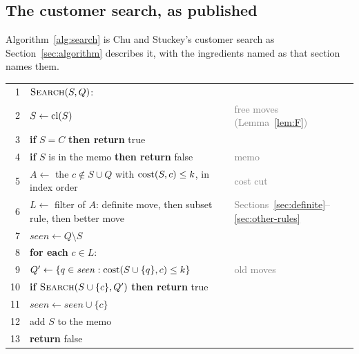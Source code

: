 \subsection{The customer search, as published}
\label{app:algorithm}

Algorithm~\ref{alg:search} is Chu and Stuckey's customer search as Section~\ref{sec:algorithm}
describes it, with the ingredients named as that section names them.

\begin{algorithm}[t]
\caption{The customer search \citep{ChuStuckey2009} is a plain depth-first
search; all its pruning sits in the memo (lines~4 and~12), the filter
(line~6) and the old moves (line~9). It decides $\Sol_k(S)$ for a graph
$G=(C,E)$ and a stack bound $k$, and is called as
$\textsc{Search}(\emptyset,\emptyset)$. $Q$ is the set of old moves the node
inherits.}
\label{alg:search}
\small
\begin{tabular}{@{}r@{\quad}l@{\qquad}l@{}}
1 & $\textsc{Search}(S,Q)$: & \\
2 & \quad $S\gets\mathrm{cl}(S)$ & \textcolor{gray}{free moves (Lemma~\ref{lem:F})} \\
3 & \quad \textbf{if} $S=C$ \textbf{then return} true & \\
4 & \quad \textbf{if} $S$ is in the memo \textbf{then return} false & \textcolor{gray}{memo} \\
5 & \quad $A\gets$ the $c\notin S\cup Q$ with $\mathrm{cost}(S,c)\le k$, in index order & \textcolor{gray}{cost cut} \\
6 & \quad $L\gets$ filter of $A$: definite move, then subset rule, then better move & \textcolor{gray}{Sections~\ref{sec:definite}--\ref{sec:other-rules}} \\
7 & \quad $\mathit{seen}\gets Q\setminus S$ & \\
8 & \quad \textbf{for each} $c\in L$: & \\
9 & \quad\quad $Q'\gets\{q\in\mathit{seen} : \mathrm{cost}(S\cup\{q\},c)\le k\}$ & \textcolor{gray}{old moves} \\
10 & \quad\quad \textbf{if} $\textsc{Search}(S\cup\{c\},Q')$ \textbf{then return} true & \\
11 & \quad\quad $\mathit{seen}\gets\mathit{seen}\cup\{c\}$ & \\
12 & \quad add $S$ to the memo & \\
13 & \quad \textbf{return} false & \\
\end{tabular}
\end{algorithm}


